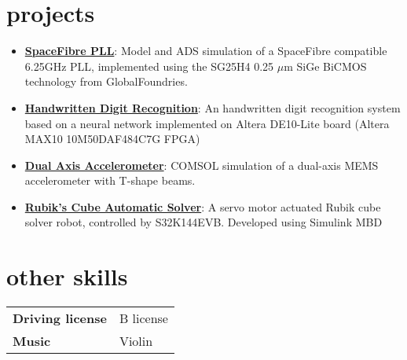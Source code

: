 \documentclass[10pt]{article}
\begin{document}
\section{projects}
\begin{itemize}[noitemsep,leftmargin=3.5mm,rightmargin=0mm,topsep=6pt]
    \item \textbf{\href{https://github.com/leonardobove/spacefiber_pll}{SpaceFibre PLL}}: Model and ADS simulation of a SpaceFibre compatible 6.25GHz PLL, implemented using the SG25H4 0.25 \(\mu\)m SiGe BiCMOS technology from GlobalFoundries.
    \item \textbf{\href{https://github.com/leonardobove/handwritten_digit_recognition}{Handwritten Digit Recognition}}: An handwritten digit recognition system based on a neural network implemented on Altera DE10-Lite board (Altera MAX10 10M50DAF484C7G FPGA)
    \item \textbf{\href{https://github.com/leonardobove/dual_axis_accelerometer}{Dual Axis Accelerometer}}: COMSOL simulation of a dual-axis MEMS accelerometer with T-shape beams.
    \item \textbf{\href{https://github.com/leonardobove/rubiks_cube_automatic_solver/tree/main}{Rubik's Cube Automatic Solver}}: A servo motor actuated Rubik cube solver robot, controlled by S32K144EVB. Developed using Simulink MBD
\end{itemize}

\section{other skills}
\begin{tabular}{l l}
    \textbf{Driving license}& B license\\
    \textbf{Music}& Violin\\
\end{tabular}
\vspace*{\fill}
\end{document}
